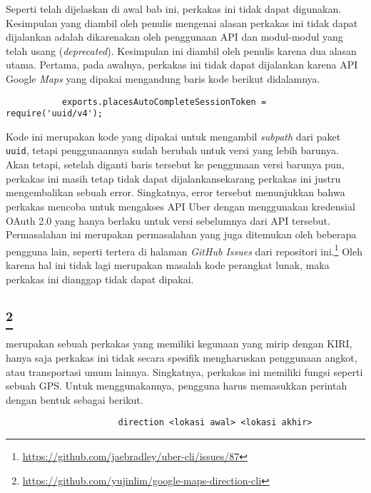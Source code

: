 Seperti telah dijelaskan di awal bab ini, perkakas ini tidak dapat digunakan. Kesimpulan yang diambil oleh penulis mengenai alasan perkakas ini tidak dapat dijalankan adalah dikarenakan oleh penggunaan API dan modul-modul yang telah usang (\textit{deprecated}). Kesimpulan ini diambil oleh penulis karena dua alasan utama. Pertama, pada awalnya, perkakas ini tidak dapat dijalankan karena API Google \textit{Maps} yang dipakai mengandung baris kode berikut didalamnya.

\begin{verbatim}
           exports.placesAutoCompleteSessionToken = require('uuid/v4');
\end{verbatim}

Kode ini merupakan kode yang dipakai untuk mengambil \textit{subpath} dari paket \verb|uuid|, tetapi penggunaannya sudah berubah untuk versi yang lebih barunya. Akan tetapi, setelah diganti baris tersebut ke penggunaan versi barunya pun, perkakas ini masih tetap tidak dapat dijalankan\textemdash sekarang perkakas ini justru mengembalikan sebuah error. Singkatnya, error tersebut menunjukkan bahwa perkakas mencoba untuk mengakses API Uber dengan menggunakan kredensial OAuth 2.0 yang hanya berlaku untuk versi sebelumnya dari API tersebut. Permasalahan ini merupakan permasalahan yang juga ditemukan oleh beberapa pengguna lain, seperti tertera di halaman \textit{GitHub Issues} dari repositori ini.\footnote{\href{https://github.com/jaebradley/uber-cli/issues/87}{https://github.com/jaebradley/uber-cli/issues/87}} Oleh karena hal ini tidak lagi merupakan masalah kode perangkat lunak, maka perkakas ini dianggap tidak dapat dipakai.

\subsection{\googlemapscli\footnote{\href{https://github.com/yujinlim/google-maps-direction-cli}{https://github.com/yujinlim/google-maps-direction-cli}}}
\label{sec:similarapps-googlemapscli}

\googlemapscli merupakan sebuah perkakas \cl yang memiliki kegunaan yang mirip dengan KIRI, hanya saja perkakas ini tidak secara spesifik mengharuskan penggunaan angkot, atau transportasi umum lainnya. Singkatnya, perkakas ini memiliki fungsi seperti sebuah GPS. Untuk menggunakannya, pengguna harus memasukkan perintah dengan bentuk sebagai berikut.

\begin{verbatim}
                      direction <lokasi awal> <lokasi akhir>
\end{verbatim}


